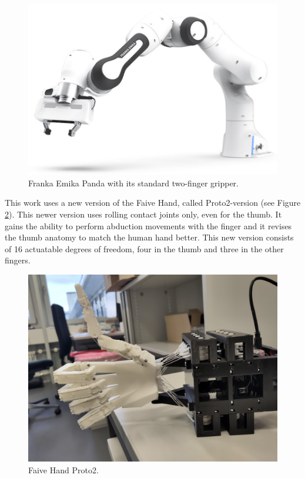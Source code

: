 \documentclass[a4paper]{article}
\begin{document}
\begin{figure}[!hb]
    \centering
    \includegraphics[scale=0.3]{images/1619174709718.jpg}
    \caption{Franka Emika Panda with its standard two-finger gripper.}
    \label{FEP}
\end{figure}

This work uses a new version of the Faive Hand, called Proto2-version (see Figure \ref{P2}). This newer version uses rolling contact joints only, even for the thumb. It gains the ability to perform abduction movements with the finger and it revises the thumb anatomy to match the human hand better. This new version consists of 16 actuatable degrees of freedom, four in the thumb and three in the other fingers.

\begin{figure}[!hb]
    \centering
    \includegraphics[scale=0.07]{images/IMG_20230327_190549.jpg}
    \caption{Faive Hand Proto2.}
    \label{P2}
\end{figure}
\end{document}
